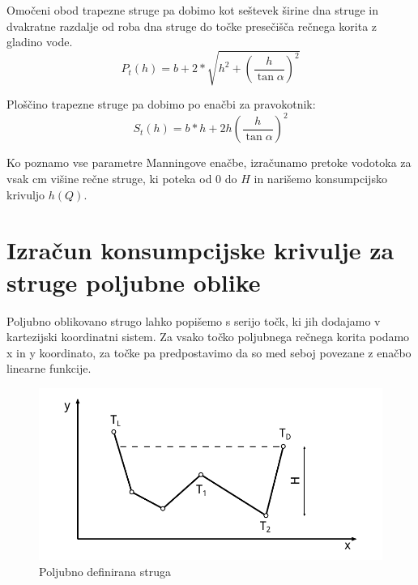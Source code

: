 \begin{enumerate}
	Omočeni obod trapezne struge pa dobimo kot seštevek širine dna struge in dvakratne razdalje od roba dna struge do točke presečišča rečnega korita z gladino vode.
	\begin{equation}
	P_{t}(h) = b + 2 * \sqrt{h^2 + \left(\dfrac{h} {\tan\alpha} \right)^{2}}
	\end{equation}
	
	Ploščino trapezne struge pa dobimo po enačbi za pravokotnik:
	\begin{equation}
	S_{t}(h) = b * h + 2 h \left( \dfrac{h}{ \tan\alpha} \right) ^ {2}
	\end{equation}
	
\end{enumerate}



Ko poznamo vse parametre Manningove enačbe, izračunamo pretoke vodotoka za vsak cm višine rečne struge, ki poteka od 0 do $H$ in narišemo konsumpcijsko krivuljo $h(Q)$.


\newpage
\section{Izračun konsumpcijske krivulje za struge poljubne oblike}\label{customChannel_algortihm}


Poljubno oblikovano strugo lahko popišemo s serijo točk, ki jih dodajamo v kartezijski koordinatni sistem. Za vsako točko poljubnega rečnega korita podamo x in y koordinato, za točke pa predpostavimo da so med seboj povezane z enačbo linearne funkcije. 

\begin{figure}[ht!]
	\begin{centering}
		\includegraphics{slike/customChannel/customStruga.pdf}		
		\caption{Poljubno definirana struga} \label{fig:poljubnaStruga}
	\end{centering}
\end{figure}



